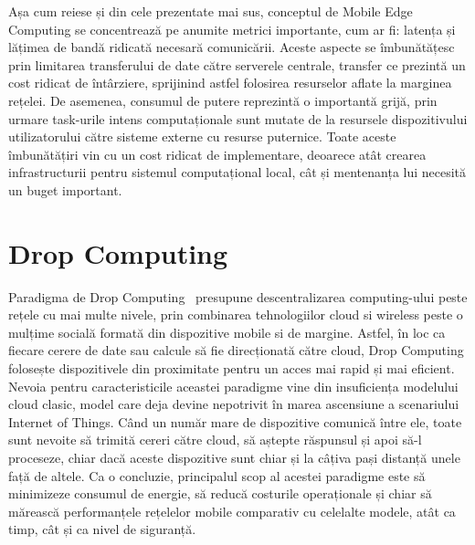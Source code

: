\documentclass[12pt,a4paper]{report}
\begin{document}
Așa cum reiese și din cele prezentate mai sus, conceptul de Mobile Edge Computing se concentrează pe anumite metrici importante, cum ar fi: latența și lățimea de bandă ridicată necesară comunicării. Aceste aspecte se îmbunătățesc prin limitarea transferului de date către serverele centrale, transfer ce prezintă un cost ridicat de întârziere, sprijinind astfel folosirea resurselor aflate la marginea rețelei. De asemenea, consumul de putere reprezintă o importantă grijă, prin urmare task-urile intens computaționale sunt mutate de la resursele dispozitivului utilizatorului către sisteme externe cu resurse puternice. Toate aceste îmbunătățiri vin cu un cost ridicat de implementare, deoarece atât crearea infrastructurii pentru sistemul computațional local, cât și mentenanța lui necesită un buget important. 

\section{Drop Computing} \label{dropComputing}
Paradigma de Drop Computing~\cite{DC} presupune descentralizarea computing-ului peste rețele cu mai multe nivele, prin combinarea tehnologiilor cloud si wireless peste o mulțime socială formată din dispozitive mobile si de margine. Astfel, în loc ca fiecare cerere de date sau calcule să fie direcționată către cloud, Drop Computing folosește dispozitivele din proximitate pentru un acces mai rapid și mai eficient. Nevoia pentru caracteristicile aceastei paradigme vine din insuficiența modelului cloud clasic, model care deja devine nepotrivit în marea ascensiune a scenariului Internet of Things. Când un număr mare de dispozitive comunică între ele, toate sunt nevoite să trimită cereri către cloud, să aștepte răspunsul și apoi să-l proceseze, chiar dacă aceste dispozitive sunt chiar și la câțiva pași distanță unele față de altele.
Ca o concluzie, principalul scop al acestei paradigme este să minimizeze consumul de energie, să reducă costurile operaționale și chiar să mărească performanțele rețelelor mobile comparativ cu celelalte modele, atât ca timp, cât și ca nivel de siguranță.
	
\end{document}
